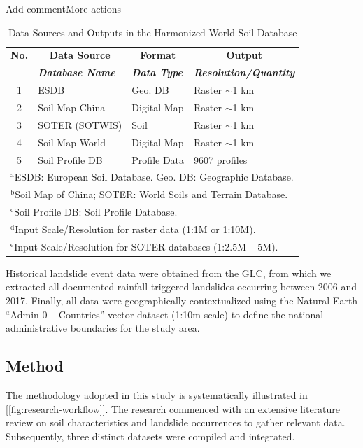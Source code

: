 \begin{table}[H]Add commentMore actions
\caption{Data Sources and Outputs in the Harmonized World Soil Database}
\centering
\begin{tabular}{|c|l|l|l|} %
\hline
\textbf{No.} & \multicolumn{1}{|c|}{\textbf{Data Source}} & \multicolumn{1}{|c|}{\textbf{Format}} & \multicolumn{1}{|c|}{\textbf{Output}} \\
\cline{2-4} %
\textbf{} & \textbf{\textit{Database Name}} & \textbf{\textit{Data Type}} & \textbf{\textit{Resolution/Quantity}} \\
\hline
1 & ESDB & Geo. DB & Raster $\sim$1 km \\
\hline
2 & Soil Map China & Digital Map & Raster $\sim$1 km \\
\hline
3 & SOTER (SOTWIS) & Soil & Raster $\sim$1 km \\
\hline
4 & Soil Map World & Digital Map & Raster $\sim$1 km \\
\hline
5 & Soil Profile DB & Profile Data & 9607 profiles \\
\hline
\multicolumn{4}{l}{$^{\mathrm{a}}$ESDB: European Soil Database. Geo. DB: Geographic Database.} \\
\multicolumn{4}{l}{$^{\mathrm{b}}$Soil Map of China; SOTER: World Soils and Terrain Database.} \\
\multicolumn{4}{l}{$^{\mathrm{c}}$Soil Profile DB: Soil Profile Database.} \\
\multicolumn{4}{l}{$^{\mathrm{d}}$Input Scale/Resolution for raster data (1:1M or 1:10M).} \\
\multicolumn{4}{l}{$^{\mathrm{e}}$Input Scale/Resolution for SOTER databases (1:2.5M – 5M).}
\end{tabular}
\label{tab:hwsd_sources_compact}
\end{table}

Historical landslide event data were obtained from the GLC, from which we extracted all documented rainfall-triggered landslides occurring between 2006 and 2017. Finally, all data were geographically contextualized using the Natural Earth “Admin 0 – Countries” vector dataset (1:10m scale) to define the national administrative boundaries for the study area.


\subsection{Method}

The methodology adopted in this study is systematically illustrated in [\ref{fig:research-workflow}]. The research commenced with an extensive literature review on soil characteristics and landslide occurrences to gather relevant data. Subsequently, three distinct datasets were compiled and integrated.

